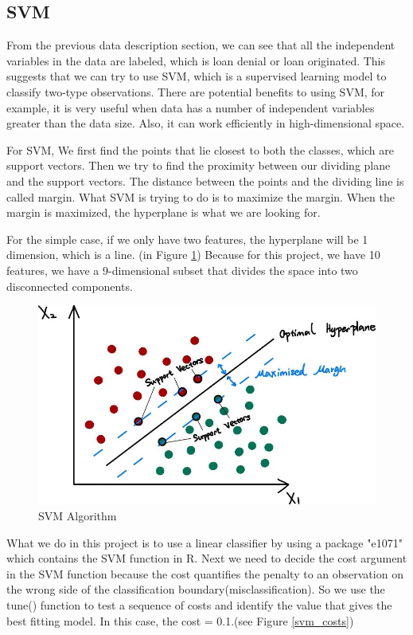 \documentclass{jpp}
\begin{document}
\subsection{SVM}

From the previous data description section, we can see that all the independent variables in the data are labeled, which is loan denial or loan originated. This suggests that we can try to use SVM, which is a supervised learning model to classify two-type observations. There are potential benefits to using SVM, for example, it is very useful when data has a number of independent variables greater than the data size. Also, it can work efficiently in high-dimensional space. 

For SVM, We first find the points that lie closest to both the classes, which are support vectors. Then we try to find the proximity between our dividing plane and the support vectors. The distance between the points and the dividing line is called margin. What SVM is trying to do is to maximize the margin. When the margin is maximized, the hyperplane is what we are looking for. 

For the simple case, if we only have two features, the hyperplane will be 1 dimension, which is a line. (in Figure \ref{svm}) Because for this project, we have 10 features, we have a 9-dimensional subset that divides the space into two disconnected components.

\begin{figure}
  \centering
  \includegraphics[width=.9\linewidth]{svm.jpg}  
  \caption{SVM Algorithm}
\label{svm}
\end{figure}

What we do in this project is to use a linear classifier by using a package "e1071" which contains the SVM function in R. Next we need to decide the cost argument in the SVM function because the cost quantifies the penalty to an observation on the wrong side of the classification boundary(misclassification). So we use the tune() function to test a sequence of costs and identify the value that gives the best fitting model. In this case, the cost = 0.1.(see Figure \ref{svm_costs})
\end{document}
